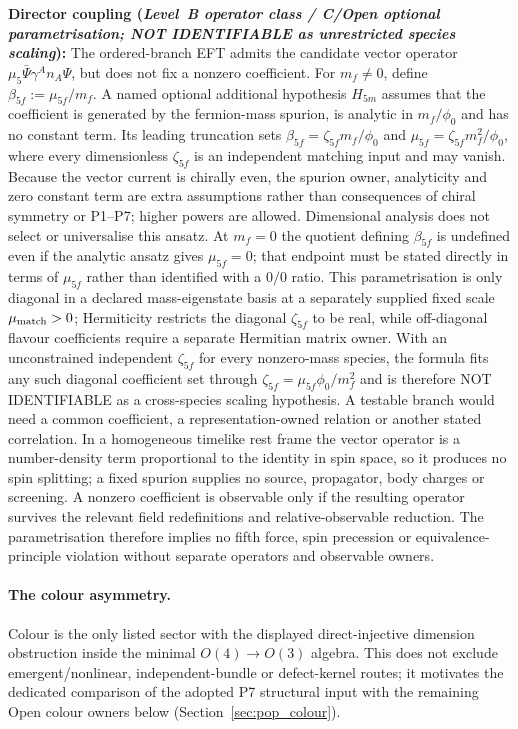 \documentclass[11pt,a4paper]{article}
\begin{document}
\textbf{Director coupling (\emph{Level~B operator class / C/Open optional
parametrisation; NOT IDENTIFIABLE as unrestricted species scaling}):} The
ordered-branch EFT admits the candidate vector operator
$\mu_5\bar\Psi\gamma^A n_A\Psi$, but does not fix a nonzero coefficient.  For $m_f\ne0$, define $\beta_{5f}:=\mu_{5f}/m_f$.  A named
optional additional hypothesis $H_{5m}$ assumes that the
coefficient is generated by the fermion-mass spurion, is analytic in
$m_f/\phi_0$ and has no constant term.  Its leading truncation sets
$\beta_{5f}=\zeta_{5f}m_f/\phi_0$ and
$\mu_{5f}=\zeta_{5f}m_f^2/\phi_0$, where every dimensionless $\zeta_{5f}$ is
an independent matching input and may vanish.  Because the vector current is
chirally even, the spurion owner, analyticity and zero constant term are extra
assumptions rather than consequences of chiral symmetry or P1--P7; higher
powers are allowed.  Dimensional analysis does not select or universalise
this ansatz.  At $m_f=0$ the quotient defining $\beta_{5f}$ is undefined even
if the analytic ansatz gives $\mu_{5f}=0$; that endpoint must be stated directly
in terms of $\mu_{5f}$ rather than identified with a $0/0$ ratio.  This parametrisation is only diagonal in a declared
mass-eigenstate basis at a separately supplied fixed scale
$\mu_{\rm match}>0$; Hermiticity restricts the diagonal $\zeta_{5f}$ to be
real, while off-diagonal flavour coefficients require a separate Hermitian
matrix owner.  With an unconstrained
independent $\zeta_{5f}$ for every nonzero-mass species, the formula fits any
such diagonal coefficient set through
$\zeta_{5f}=\mu_{5f}\phi_0/m_f^2$ and is therefore NOT IDENTIFIABLE as a
cross-species scaling hypothesis.  A testable branch would
need a common coefficient, a representation-owned relation or another stated
correlation.  In a homogeneous timelike rest frame the vector operator is a
number-density term proportional to the identity in spin space, so it
produces no spin splitting; a fixed spurion supplies no source, propagator,
body charges or screening.  A nonzero coefficient is observable only if the
resulting operator survives the relevant field redefinitions and
relative-observable reduction.  The parametrisation therefore implies no
fifth force, spin precession or equivalence-principle violation without
separate operators and observable owners.

\paragraph{The colour asymmetry.}
Colour is the only listed sector with the displayed direct-injective dimension obstruction inside the minimal $O(4)\to O(3)$ algebra.  This does not exclude emergent/nonlinear, independent-bundle or defect-kernel routes; it motivates the dedicated comparison of the adopted P7 structural input with the remaining Open colour owners below (Section~\ref{sec:pop_colour}).
\end{document}
